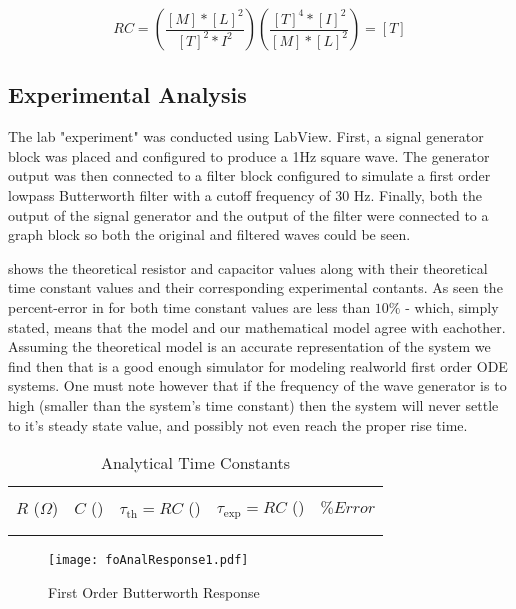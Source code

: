 \documentclass[main.tex]{subfile}
\begin{document}
	\[RC = (\frac{[M] * [L]^2}{[T]^2 * I^2} )(\frac{[T]^4 * [I]^2}{[M] * [L]^2}) = [T]\]

\subsection{Experimental Analysis}

The lab "experiment" was conducted using LabView. First, a signal generator
block was placed and configured to produce a 1Hz square wave. The generator
output was then connected to a filter block configured to simulate a first order
lowpass Butterworth filter with a cutoff frequency of 30 Hz. Finally, both the
output of the signal generator and the output of the filter were connected to a
graph block so both the original and filtered waves could be seen.


 shows the theoretical resistor and capacitor values along
with their theoretical time constant values and their corresponding experimental
contants. As seen the percent-error in for both time constant values are less
than $10\%$ - which, simply stated, means that the \Labview model and our
mathematical model agree with eachother. Assuming the theoretical model is an
accurate representation of the system we find then that \Labview is a good
enough simulator for modeling realworld first order ODE systems. One must note
however that if the frequency of the wave generator is to high (smaller than the
system's time constant) then the system will never settle to it's steady state
value, and possibly not even reach the proper rise time.

\begin{table}[H]
  \begin{center}
		\caption{Analytical Time Constants}
		\label{tab:fo_a_taus}
		\begin{tabular}{ccccc}
      \\ \toprule
			\\ $R$ ($\Omega$) & $C$ (\dem{mF}) & $\tau_{\text{th}} = RC$ (\dem{s}) & $\tau_{\text{exp}} = RC$ (\dem{s}) & $\%Error$
      \\ \midrule
			\\ 
      \\ \bottomrule
    \end{tabular}
  \end{center}
\end{table}

\begin{figure}[H]
	\begin{center}
    \texttt{[image: foAnalResponse1.pdf]}
	\end{center}
	\caption{First Order Butterworth Response}
	\label{fig:foGraph}
\end{figure}


\end{document}
